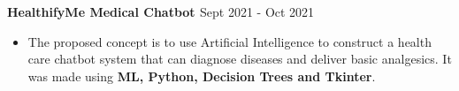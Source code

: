 \textbf{{HealthifyMe Medical Chatbot \href{https://github.com/priyansh17/healthify-life-medical-chatbot}{\faExternalLinkSquare}}} \hfill {\faCalendar} Sept 2021 - Oct 2021 \par
\begin{itemize}
	\item The proposed concept is to use Artificial Intelligence to construct a health care chatbot system that can diagnose diseases and deliver basic analgesics. It was made using \textbf{ML, Python, Decision Trees and Tkinter}.
\end{itemize}\vspace{0.1cm} \par